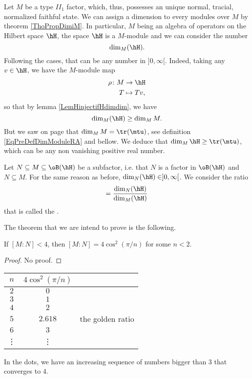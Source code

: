 Let $M$ be a type $II_1$ factor, which, thus, possesses an unique normal, tracial, normalized faithful state. We can assign a dimension to every modules over $M$ by theorem \ref{ThoPropDimiM}. In particular, $M$ being an algebra of operators on the Hilbert space $\hH$, the space $\hH$ is a $M$-module and we can consider the number
\begin{equation}
	\dim_M(\hH).
\end{equation}
Following the cases, that can be any number in $]0,\infty[$. Indeed, taking any $v\in\hH$, we have the $M$-module map 
\begin{equation}
\begin{aligned}
 \rho\colon M&\to \hH \\ 
   T&\mapsto Tv ,
\end{aligned}
\end{equation}
so that by lemma \ref{LemHinjectifHdimdim}, we have
\begin{equation}
	\dim_M(\hH)\geq\dim_MM.
\end{equation}
But we saw on page \pageref{subsubsecExemDimMMMod} that $\dim_MM=\tr(\mtu)$, see definition \eqref{EqPreDefDimModuleRA} and bellow. We deduce that $\dim_M\hH\geq \tr(\mtu)$, which can be any non vanishing positive real number.

Let $N\subseteq M\subseteq \oB(\hH)$ be a subfactor, i.e. that $N$ is a factor in $\oB(\hH)$ and $N\subseteq M$. For the same reason as before, $\dim_N(\hH)\in]0,\infty[$. We consider the ratio
\begin{equation}
	[M:N]=\frac{ \dim_N(\hH) }{ \dim_M(\hH) }
\end{equation}
that is called the .

The theorem that we are intend to prove is the following.
\begin{theorem}[Jones]
If $[M:N]<4$, then $[M:N]=4\cos^2(\pi/n)$ for some $n<2$.
\end{theorem}

\begin{proof}
No proof.
\end{proof}

\begin{center}
\begin{tabular}{ccr}
	$n$		&	$4\cos^2(\pi/n)$\\
\hline
	$2$		&	$0$\\
	$3$		&	$1$\\
	$4$		&	$2$\\
	$5$		&	$2.618$		& the golden ratio\\
	$6$		&	$3$\\
	\vdots		&	\vdots	
\end{tabular}
\end{center}
In the dots, we have an increasing sequence of numbers bigger than $3$ that converges to $4$.

